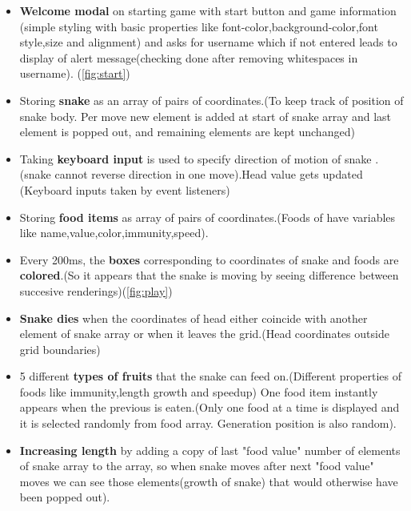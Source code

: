 \documentclass[12pt]{article}
\begin{document}
\begin{itemize}[leftmargin=1.5em]
    \item \textbf{Welcome modal} on starting game with start button and game information (simple styling with basic properties like font-color,background-color,font style,size and alignment) and asks for username which if not entered leads to display of alert message(checking done after removing whitespaces in username). (\ref{fig:start})\\
    \item Storing \textbf{snake} as an array of pairs of coordinates.(To keep track of position of snake body. Per move new element is added at start of snake array and last element is popped out, and remaining elements are kept unchanged)\\
    \item Taking \textbf{keyboard input} is used to specify direction of motion of snake .(snake cannot reverse direction in one move).Head value gets updated (Keyboard inputs taken by event listeners)\\
    \item Storing \textbf{food items} as array of pairs of coordinates.(Foods  of have variables like name,value,color,immunity,speed).\\
    \item Every 200ms, the \textbf{boxes} corresponding to coordinates of snake and foods are \textbf{colored}.(So it appears that the snake is moving by seeing difference between succesive renderings)(\ref{fig:play})\\
    \item \textbf{Snake dies} when the coordinates of head either coincide with another element of snake array or when it leaves the grid.(Head coordinates outside grid boundaries)\\
    \item 5 different \textbf{types of fruits} that the snake can feed on.(Different properties of foods like immunity,length growth and speedup) One food item instantly appears when the previous is eaten.(Only one food at a time is displayed and it is selected randomly from food array. Generation position is also random).\\
    \item \textbf{Increasing length} by adding a copy of last "food value" number of elements of snake array to the array, so when snake moves after next "food value" moves we can see those elements(growth of snake) that would otherwise have been popped out).  \\

\end{itemize}
\end{document}
